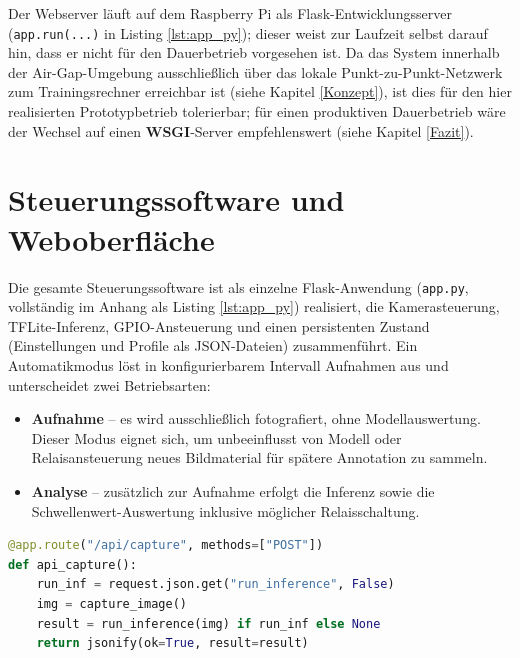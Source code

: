 Der Webserver läuft auf dem Raspberry Pi als Flask-Entwicklungsserver (\texttt{app.run(...)} in Listing \ref{lst:app_py}); dieser weist zur Laufzeit selbst darauf hin, dass er nicht für den Dauerbetrieb vorgesehen ist. Da das System innerhalb der Air-Gap-Umgebung ausschließlich über das lokale Punkt-zu-Punkt-Netzwerk zum Trainingsrechner erreichbar ist (siehe Kapitel \ref{Konzept}), ist dies für den hier realisierten Prototypbetrieb tolerierbar; für einen produktiven Dauerbetrieb wäre der Wechsel auf einen \textbf{WSGI}-Server empfehlenswert (siehe Kapitel \ref{Fazit}).

\section{Steuerungssoftware und Weboberfläche}
\label{sec:Weboberflaeche}

Die gesamte Steuerungssoftware ist als einzelne Flask-Anwendung (\texttt{app.py}, vollständig im Anhang als Listing \ref{lst:app_py}) realisiert, die Kamerasteuerung, TFLite-Inferenz, GPIO-Ansteuerung und einen persistenten Zustand (Einstellungen und Profile als JSON-Dateien) zusammenführt. Ein Automatikmodus löst in konfigurierbarem Intervall Aufnahmen aus und unterscheidet zwei Betriebsarten:

\begin{itemize}
    \item \textbf{Aufnahme} -- es wird ausschließlich fotografiert, ohne Modellauswertung. Dieser Modus eignet sich, um unbeeinflusst von Modell oder Relaisansteuerung neues Bildmaterial für spätere Annotation zu sammeln.
    \item \textbf{Analyse} -- zusätzlich zur Aufnahme erfolgt die Inferenz sowie die Schwellenwert-Auswertung inklusive möglicher Relaisschaltung.
\end{itemize}

\begin{lstlisting}[language=Python, caption=Repräsentativer API-Endpunkt der Weboberfläche für eine manuell ausgelöste Aufnahme (gekürzt)\, vollständig in Listing \ref{lst:app_py}, label=lst:api_capture]
@app.route("/api/capture", methods=["POST"])
def api_capture():
    run_inf = request.json.get("run_inference", False)
    img = capture_image()
    result = run_inference(img) if run_inf else None
    return jsonify(ok=True, result=result)
\end{lstlisting}

